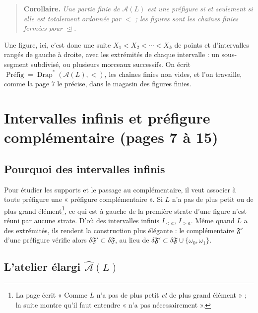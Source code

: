 \documentclass[11pt,a4paper]{article}
\begin{document}
\begin{quote}
\textbf{Corollaire.} \emph{Une partie finie de $\mathcal{A}(L)$ est une
préfigure si et seulement si elle est totalement ordonnée par $<$ ; les figures
sont les chaînes finies fermées pour $\trianglelefteq$.}
\end{quote}

Une figure, ici, c'est donc une suite $X_{1} < X_{2} < \cdots < X_{k}$ de points
et d'intervalles rangés de gauche à droite, avec les extrémités de chaque
intervalle : un sous-segment subdivisé, ou plusieurs morceaux successifs. On
écrit $\operatorname{\text{Préfig}} = \operatorname{Drap}^{*}(\mathcal{A}(L),
<)$, les chaînes finies non vides, et l'on travaille, comme la page 7 le
précise, dans le magasin des figures finies.

\section*{Intervalles infinis et préfigure complémentaire (pages 7 à 15)}

\subsection*{Pourquoi des intervalles infinis}

Pour étudier les supports et le passage au complémentaire, il veut associer à
toute préfigure une « préfigure complémentaire ». Si $L$ n'a pas de plus petit
ou de plus grand élément\footnote{La page écrit « Comme $L$ n'a pas de plus
petit \emph{et} de plus grand élément » ; la suite montre qu'il faut entendre
« n'a pas nécessairement ».}, ce qui est à gauche de la première strate d'une
figure n'est réuni par aucune strate. D'où des intervalles infinis $I_{<a}$,
$I_{>a}$. Même quand $L$ a des extrémités, ils rendent la construction plus
élégante : le complémentaire $\mathfrak{F}'$ d'une préfigure vérifie alors
$\delta \mathfrak{F}' \subset \delta \mathfrak{F}$, au lieu de $\delta
\mathfrak{F}' \subset \delta \mathfrak{F} \cup \{\omega_{0}, \omega_{1}\}$.

\subsection*{L'atelier élargi $\widehat{\mathcal{A}}(L)$}
\end{document}
